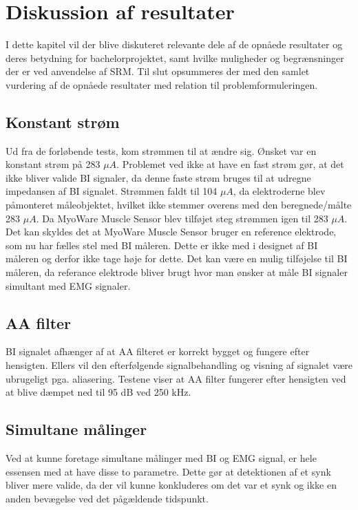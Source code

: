 \chapter{Diskussion af resultater}

I dette kapitel vil der blive diskuteret relevante dele af de opnåede resultater og deres betydning for bachelorprojektet, samt hvilke muligheder og begrænsninger der er ved anvendelse af SRM. Til slut opsummeres der med den samlet vurdering af de opnåede resultater med relation til problemformuleringen.

\section{Konstant strøm}
Ud fra de forløbende tests, kom strømmen til at ændre sig. Ønsket var en konstant strøm på 283 $\mu A$. Problemet ved ikke at have en fast strøm gør, at det ikke bliver valide BI signaler, da denne faste strøm bruges til at udregne impedansen af BI signalet. Strømmen faldt til 104 $\mu A$, da elektroderne blev påmonteret måleobjektet, hvilket ikke stemmer overens med den beregnede/målte 283 $\mu A$. Da MyoWare Muscle Sensor blev tilføjet steg strømmen igen til 283 $\mu A$. Det kan skyldes det at MyoWare Muscle Sensor bruger en reference elektrode, som nu har fælles stel med BI måleren. Dette er ikke med i designet af BI måleren og derfor ikke tage høje for dette. Det kan være en mulig tilføjelse til BI måleren, da referance elektrode bliver brugt hvor man ønsker at måle BI signaler simultant med EMG signaler\cite{Nahrstaedt2012a}. 

\section{AA filter}
BI signalet afhænger af at AA filteret er korrekt bygget og fungere efter hensigten. Ellers vil den efterfølgende signalbehandling og visning af signalet være ubrugeligt pga. aliasering. Testene viser at AA filter fungerer efter hensigten ved at blive dæmpet ned til 95 dB ved 250 kHz. 

\section{Simultane målinger}
Ved at kunne foretage simultane målinger med BI og EMG signal, er hele essensen med at have disse to parametre. Dette gør at detektionen af et synk bliver mere valide, da der vil kunne konkluderes om det var et synk og ikke en anden bevægelse ved det pågældende tidspunkt. 



